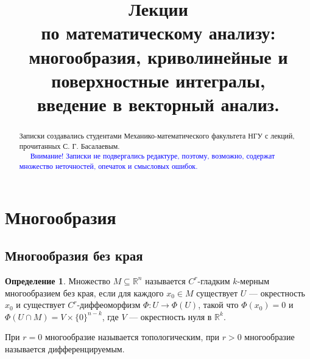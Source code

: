 \documentclass[a5paper]{article}
\newcounter{through}
\theoremstyle{plain}
\theoremstyle{definition}
\newtheorem{definition}[through]{Определение}
\numberwithin{through}{section}
\numberwithin{equation}{section}
\begin{document}
	
	
	\title{Лекции \\
	по математическому анализу:\\
	многообразия, криволинейные и поверхностные интегралы, \\
	введение в векторный анализ.}
	\maketitle
	
	\begin{abstract}
		Записки создавались студентами Механико-математического факультета НГУ 
		с лекций, прочитанных С. Г. Басалаевым.
		\\
	
		\textcolor{blue}{~~~Внимание! Записки не подвергались редактуре, поэтому, возможно, содержат множество неточностей, опечаток и смысловых ошибок.} 
		
	\end{abstract}

\clearpage
\tableofcontents

\clearpage


\section{Многообразия}

\subsection{Многообразия без края}

\begin{definition}
	\label{ManifoldNoBoundary}
	Множество $M \subseteq \mathbb{R}^n$ называется $C^r$-гладким $k$-мерным
	многообразием  без края, если для каждого $x_0 \in M$ существует $U$ --- окрестность
	$x_0$ и существует $ C^r$-диффеоморфизм $\Phi : U \to \Phi (U)$, такой что 
	$\Phi(x_0)=0$ и $\Phi(U \cap M) = V \times \{0\}^{n-k}$, где $V$ --- окрестность нуля в $\mathbb{R}^k$.
\end{definition}

При $r = 0$ многообразие называется топологическим, при $r > 0$ многообразие называется дифференцируемым.
\end{document}
